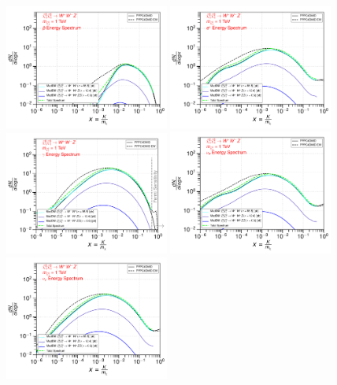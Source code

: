 \documentclass[epj,nopacs,fleqn]{svjour}
\begin{document}
\begin{figure}[!h]
\centering
\subfigure
{ \includegraphics[width=0.48\textwidth]{Fig/Validation_1009/1_antiprotons_n1ww_single_1.pdf} } 
\subfigure
{\includegraphics[width=0.48\textwidth]{Fig/Validation_1009/1_positrons_n1ww_single_1.pdf} }
\subfigure
{\includegraphics[width=0.48\textwidth]{Fig/Validation_1009/1_gammas_n1ww_single_1.pdf} }
\subfigure
{\includegraphics[width=0.48\textwidth]{Fig/Validation_1009/1_neutrinos_e_n1ww_single_1.pdf} }
\subfigure
{\includegraphics[width=0.48\textwidth]{Fig/Validation_1009/1_neutrinos_mu_n1ww_single_1.pdf} }

\end{figure}
\end{document}

